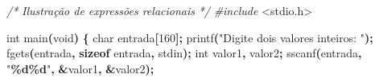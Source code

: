 \documentclass[
  11pt,
  a4paper,
]{scrbook}
\newenvironment{Shaded}{\begin{snugshade}}{\end{snugshade}}
\newcommand{\CommentTok}[1]{\textcolor[rgb]{0.56,0.35,0.01}{\textit{#1}}}
\newcommand{\DataTypeTok}[1]{\textcolor[rgb]{0.13,0.29,0.53}{#1}}
\newcommand{\DecValTok}[1]{\textcolor[rgb]{0.00,0.00,0.81}{#1}}
\newcommand{\ImportTok}[1]{#1}
\newcommand{\KeywordTok}[1]{\textcolor[rgb]{0.13,0.29,0.53}{\textbf{#1}}}
\newcommand{\NormalTok}[1]{#1}
\newcommand{\OperatorTok}[1]{\textcolor[rgb]{0.81,0.36,0.00}{\textbf{#1}}}
\newcommand{\PreprocessorTok}[1]{\textcolor[rgb]{0.56,0.35,0.01}{\textit{#1}}}
\newcommand{\SpecialCharTok}[1]{\textcolor[rgb]{0.81,0.36,0.00}{\textbf{#1}}}
\newcommand{\StringTok}[1]{\textcolor[rgb]{0.31,0.60,0.02}{#1}}
\begin{document}
\begin{Shaded}
\begin{Highlighting}[]
\CommentTok{/*}
\CommentTok{Ilustração de expressões relacionais}
\CommentTok{*/}
\PreprocessorTok{\#include }\ImportTok{\textless{}stdio.h\textgreater{}}

\DataTypeTok{int}\NormalTok{ main}\OperatorTok{(}\DataTypeTok{void}\OperatorTok{)} \OperatorTok{\{}
    \DataTypeTok{char}\NormalTok{ entrada}\OperatorTok{[}\DecValTok{160}\OperatorTok{];}
\NormalTok{    printf}\OperatorTok{(}\StringTok{"Digite dois valores inteiros: "}\OperatorTok{);}
\NormalTok{    fgets}\OperatorTok{(}\NormalTok{entrada}\OperatorTok{,} \KeywordTok{sizeof}\NormalTok{ entrada}\OperatorTok{,}\NormalTok{ stdin}\OperatorTok{);}
    \DataTypeTok{int}\NormalTok{ valor1}\OperatorTok{,}\NormalTok{ valor2}\OperatorTok{;}
\NormalTok{    sscanf}\OperatorTok{(}\NormalTok{entrada}\OperatorTok{,} \StringTok{"}\SpecialCharTok{\%d\%d}\StringTok{"}\OperatorTok{,} \OperatorTok{\&}\NormalTok{valor1}\OperatorTok{,} \OperatorTok{\&}\NormalTok{valor2}\OperatorTok{);}


\end{Highlighting}
\end{Shaded}
\end{document}
